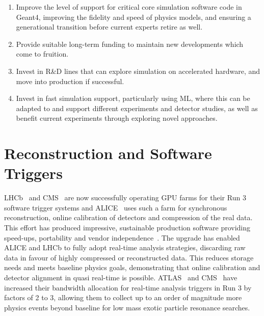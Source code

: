 \documentclass[10pt,a4paper]{article}
\begin{document}
\begin{enumerate}
\def\labelenumi{\arabic{enumi}.}
\item
  Improve the level of support for critical core simulation software code in
  Geant4, improving the fidelity and speed of physics models, and ensuring a
  generational transition before current experts retire as well.
\item
  Provide suitable long-term funding to maintain new developments which
  come to fruition.
\item
  Invest in R\&D lines that can explore simulation on accelerated
  hardware, and move into production if successful.
\item
  Invest in fast simulation support, particularly using ML, where this
  can be adapted to and support different experiments and detector
  studies, as well as benefit current experiments through exploring
  novel approaches.
\end{enumerate}

\section{Reconstruction and Software
Triggers}\label{reconstruction-and-software-triggers}

LHCb~\cite{LHCb:RTDP} and CMS~\cite{CMS:Detector_R3}
are now successfully operating GPU farms for their
Run 3 software trigger systems and ALICE~\cite{ALICE:LS2_upgrades} uses such a farm for
synchronous reconstruction,
online calibration of detectors and compression of the real data. This
effort has produced impressive, sustainable production software providing
speed-ups, portability and vendor
independence~\cite{Concas:2024cyu, Aaij2020Allen,MathesP3MA2017}. The
upgrade has enabled ALICE and LHCb to fully adopt real-time analysis strategies,
discarding raw data in favour of highly compressed or reconstructed
data. This reduces storage needs and meets baseline physics goals, demonstrating that
online calibration and detector alignment in quasi real-time is possible.
ATLAS~\cite{ATLAS:trigger_LS3} and CMS~\cite{CMS:enriching_phys_programs}
have increased their bandwidth allocation for real-time
analysis triggers in Run 3 by factors of 2 to 3, allowing them to
collect up to an order of magnitude more physics events beyond
baseline for low mass exotic particle resonance searches.
\end{document}
